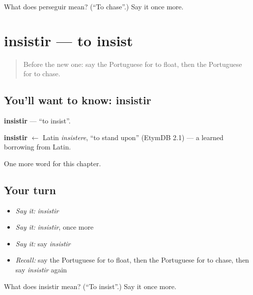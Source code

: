 \begin{tcolorbox}[breakable,colback=teal!4,colframe=teal!35!black,title={Before you move on}]
What does perseguir mean? (\textquotedblleft{}To chase\textquotedblright{}.) Say it once more.
\end{tcolorbox}
\section[insistir]{insistir — to insist}

\label{lesson:PT-C145-insistir}



\begin{quote}
Before the new one: say the Portuguese for to float, then the Portuguese for to chase.
\end{quote}

\subsection*{You'll want to know: insistir}
\textbf{insistir} — \textquotedblleft{}to insist\textquotedblright{}.

\begin{cousinweb}
\textbf{insistir} $\leftarrow$ Latin \emph{insistere}, \textquotedblleft{}to stand upon\textquotedblright{} (EtymDB 2.1) — a learned borrowing from Latin.
\end{cousinweb}

\begin{grammarlens}[title={What you've built}]
One more word for this chapter.
\end{grammarlens}

\subsection*{Your turn}
\begin{itemize}
\raggedright
  \item \emph{Say it:} \emph{insistir}
  \item \emph{Say it:} \emph{insistir}, once more
  \item \emph{Say it:} say \emph{insistir}
  \item \emph{Recall:} say the Portuguese for to float, then the Portuguese for to chase, then say \emph{insistir} again
\end{itemize}

\begin{tcolorbox}[breakable,colback=teal!4,colframe=teal!35!black,title={Before you move on}]
What does insistir mean? (\textquotedblleft{}To insist\textquotedblright{}.) Say it once more.
\end{tcolorbox}
